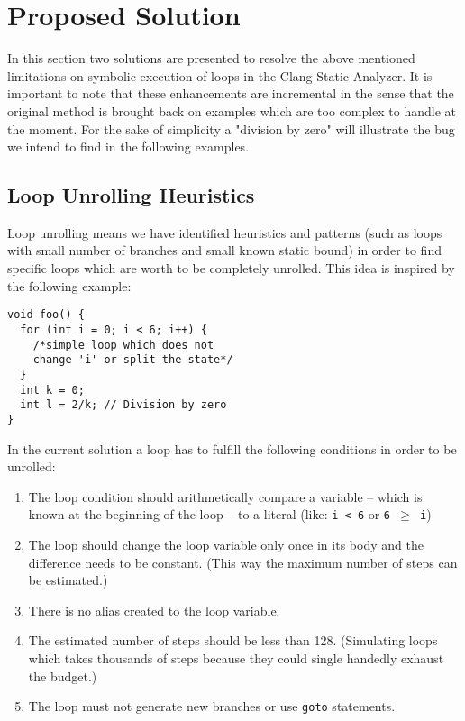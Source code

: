 
\section{Proposed Solution}
In this section two solutions are presented to resolve the above mentioned
limitations on symbolic execution of loops in the Clang Static Analyzer. It 
is important to note that these enhancements are incremental in the sense 
that the original method is brought back on examples which are too complex to handle at the moment. For the sake of simplicity a 
"division by zero" will illustrate the bug we intend to find in the following examples.

\subsection{Loop Unrolling Heuristics}
Loop unrolling means we have identified heuristics and patterns (such as 
loops
with small number of branches and small known static bound) in order to find
specific loops which are worth to be completely unrolled. This idea is 
inspired by the following example:

\begin{lstlisting}
void foo() {
  for (int i = 0; i < 6; i++) {
    /*simple loop which does not
    change 'i' or split the state*/
  }
  int k = 0;
  int l = 2/k; // Division by zero
}\end{lstlisting}

In the current solution a loop has to fulfill the following conditions in order 
to be unrolled:
\begin{enumerate}  
	\item The loop condition should arithmetically compare a variable -- 
	which is known at the beginning of the loop -- to a literal (like: 				\texttt{i~<~6} or \texttt{6~$\ge$~i})
	\item The loop should change the loop variable only once in its body 
	and the	difference needs to be constant. (This way the maximum number of 
	steps can be estimated.)
    \item There is no alias created to the loop variable.
	\item The estimated number of steps should be less than 128. (Simulating 
	loops which takes thousands of steps because they could single handedly 
	exhaust the budget.)
	\item The loop must not generate new branches or use \texttt{goto} 
	statements.
\end{enumerate}


